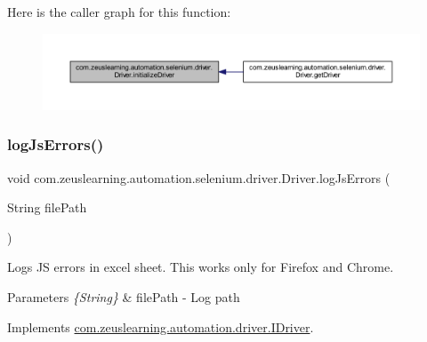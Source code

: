 Here is the caller graph for this function\+:\nopagebreak
\begin{figure}[H]
\begin{center}
\leavevmode
\includegraphics[width=350pt]{d7/dcc/classcom_1_1zeuslearning_1_1automation_1_1selenium_1_1driver_1_1Driver_a5a80edeb2ead34ac5d92f331a1f59388_icgraph}
\end{center}
\end{figure}
\hypertarget{classcom_1_1zeuslearning_1_1automation_1_1selenium_1_1driver_1_1Driver_a5e4cf6f7ea41db7d15f35aaa1052bd0f}{}\label{classcom_1_1zeuslearning_1_1automation_1_1selenium_1_1driver_1_1Driver_a5e4cf6f7ea41db7d15f35aaa1052bd0f} 
\subsubsection{\texorpdfstring{log\+Js\+Errors()}{logJsErrors()}}
{\footnotesize\ttfamily void com.\+zeuslearning.\+automation.\+selenium.\+driver.\+Driver.\+log\+Js\+Errors (\begin{DoxyParamCaption}\item[{String}]{file\+Path }\end{DoxyParamCaption})\hspace{0.3cm}{\ttfamily [inline]}}

Logs JS errors in excel sheet. This works only for Firefox and Chrome.


\begin{DoxyParams}{Parameters}
{\em \{\+String\}} & file\+Path -\/ Log path \\
\hline
\end{DoxyParams}


Implements \hyperlink{interfacecom_1_1zeuslearning_1_1automation_1_1driver_1_1IDriver_ad474f0bb118dd3e0737e42a8c7a2f51e}{com.\+zeuslearning.\+automation.\+driver.\+I\+Driver}.

